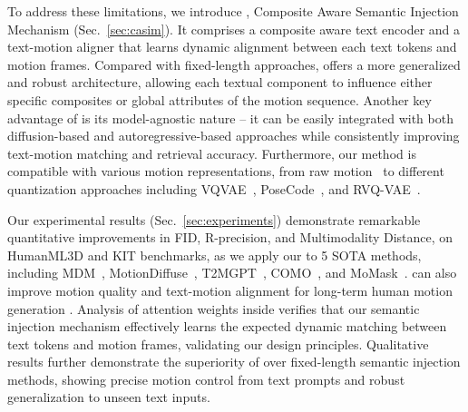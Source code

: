 To address these limitations, we introduce {\modulename}, Composite Aware Semantic Injection Mechanism (Sec.~\ref{sec:casim}). 
It comprises a composite aware text encoder and a text-motion aligner that learns dynamic alignment between each text tokens and motion frames.
Compared with fixed-length approaches, {\modulename} offers a more generalized and robust architecture, allowing each textual component to influence either specific composites or global attributes of the motion sequence.
Another key advantage of {\modulename} is its model-agnostic nature -- it can be easily integrated with both diffusion-based and autoregressive-based approaches while consistently improving text-motion matching and retrieval accuracy.
Furthermore, our method is compatible with various motion representations, from raw motion~\cite{tevet2023human} to different quantization approaches including VQVAE~\cite{zhang2023generating}, PoseCode~\cite{huang2024como}, and RVQ-VAE~\cite{guo2023momask}.


Our experimental results (Sec.~\ref{sec:experiments}) demonstrate remarkable quantitative improvements in FID, R-precision, and Multimodality Distance, on HumanML3D and KIT benchmarks, as we apply our {\modulename} to 5 SOTA methods, including MDM~\cite{tevet2023human}, MotionDiffuse~\cite{zhang2022motiondiffuse}, T2MGPT~\cite{zhang2023generating}, COMO~\cite{huang2024como}, and MoMask~\cite{guo2023momask}.
{\modulename} can also improve motion quality and text-motion alignment for long-term human motion generation \cite{shafir2024human, lee2024t2lm}.
Analysis of attention weights inside {\modulename} verifies that our semantic injection mechanism effectively learns the expected dynamic matching between text tokens and motion frames, validating our design principles.
Qualitative results further demonstrate the superiority of {\modulename} over fixed-length semantic injection methods, showing precise motion control from text prompts and robust generalization to unseen text inputs.


